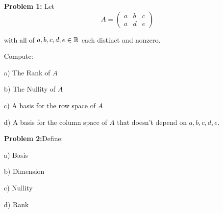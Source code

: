 \documentclass[a4paper,12pt]{article}
\begin{document}
{\Large{\bf Problem 1:}} Let \[ A= \left( \begin{array}{ccc}a & b & c \\
a & d & e  \end{array} \right)\]

with all of $a,b,c,d,e \in \mathbb{R}$ each distinct and nonzero.

Compute:

a) The Rank of $A$

b) The Nullity of $A$

c) A basis for the row space of $A$

d) A basis for the column space of $A$ that doesn't depend on $a, b, c, d,e$.

{\Large{\bf Problem 2:}}Define:

a) Basis

b) Dimension

c) Nullity

d) Rank
\end{document}
